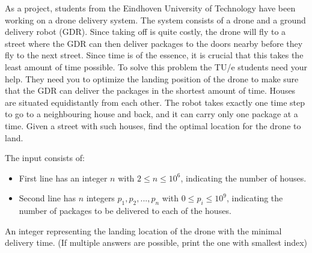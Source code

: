\problemname{\problemyamlname}


\newcommand{\maxa}{123456789}

As a project, students from the Eindhoven University of Technology have been working on a drone delivery system. The system consists of a drone and a ground delivery robot (GDR). Since taking off is quite costly, the drone will fly to a street where the GDR can then deliver packages to the doors nearby before they fly to the next street. Since time is of the essence, it is crucial that this takes the least amount of time possible. To solve this problem the TU/e students need your help. They need you to optimize the landing position of the drone to make sure that the GDR can deliver the packages in the shortest amount of time.
Houses are situated equidistantly from each other. The robot takes exactly one time step to go to a neighbouring house and back, and it can carry only one package at a time.
Given a street with such houses, find the optimal location for the drone to land.

\begin{Input}
    The input consists of:
    \begin{itemize}
        \item First line has an integer $n$ with $2 \leq n \leq 10^6$, indicating the number of houses.
        \item Second line has $n$ integers $p_1, p_2, ..., p_n$ with $0 \leq p_i \leq 10^9$, indicating the number of packages to be delivered to each of the houses.
    \end{itemize}
\end{Input}

\begin{Output}
    An integer representing the landing location of the drone with the minimal delivery time. (If multiple answers are possible, print the one with smallest index)
\end{Output}
